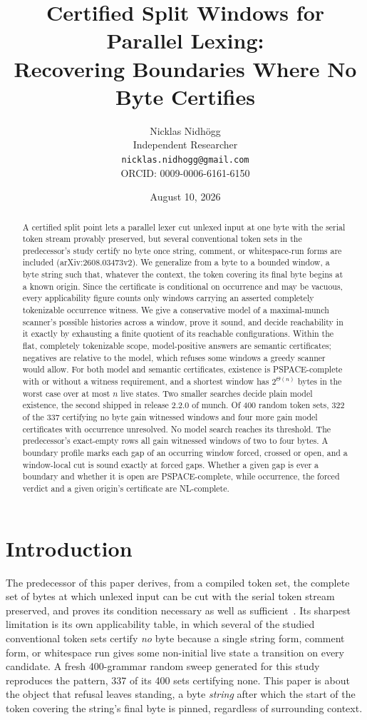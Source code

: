 \documentclass[11pt,a4paper]{article}
\title{Certified Split Windows for Parallel Lexing:\\Recovering Boundaries Where No Byte Certifies}
\author{Nicklas Nidh\"ogg\\[0.4em] \normalsize Independent Researcher\\ \normalsize
\texttt{nicklas.nidhogg@gmail.com}\\ \normalsize ORCID: 0009-0006-6161-6150}
\date{August 10, 2026}
\theoremstyle{definition}
\theoremstyle{plain}
\begin{document}
\maketitle

\begin{abstract}
A certified split point lets a parallel lexer cut unlexed input at one byte with the serial token stream provably
preserved, but several conventional token sets in the predecessor's study certify no byte once string, comment, or
whitespace-run forms are included (arXiv:2608.03473v2). We generalize from a byte to a bounded window, a byte string
such that, whatever the context, the token covering its final byte begins at a known origin. Since the certificate is
conditional on occurrence and may be vacuous, every applicability figure counts only windows carrying an asserted
completely tokenizable occurrence witness. We give a conservative model of a maximal-munch scanner's possible histories
across a window, prove it sound, and decide reachability in it exactly by exhausting a finite quotient of its reachable
configurations. Within the flat, completely tokenizable scope, model-positive answers are semantic certificates;
negatives are relative to the model, which refuses some windows a greedy scanner would allow. For both model and
semantic certificates, existence is PSPACE-complete with or without a witness requirement, and a shortest window has
$2^{\Theta(n)}$ bytes in the worst case over at most $n$ live states. Two smaller searches decide plain model existence,
the second shipped in release 2.2.0 of munch. Of 400 random token sets, 322 of the 337 certifying no byte gain witnessed
windows and four more gain model certificates with occurrence unresolved. No model search reaches its threshold. The
predecessor's exact-empty rows all gain witnessed windows of two to four bytes. A boundary profile marks each gap of an
occurring window forced, crossed or open, and a window-local cut is sound exactly at forced gaps. Whether a given gap is
ever a boundary and whether it is open are PSPACE-complete, while occurrence, the forced verdict and a given origin's
certificate are NL-complete.
\end{abstract}

\section{Introduction}
\label{sec:introduction}

The predecessor of this paper derives, from a compiled token set, the complete set of bytes at which unlexed input can
be cut with the serial token stream preserved, and proves its condition necessary as well as
sufficient~\cite{nidhogg2026splitpoints}. Its sharpest limitation is its own applicability table, in which several of
the studied conventional token sets certify \emph{no} byte because a single string form, comment form, or whitespace run
gives some non-initial live state a transition on every candidate. A fresh 400-grammar random sweep generated for this
study reproduces the pattern, 337 of its 400 sets certifying none. This paper is about the object that refusal leaves
standing, a byte \emph{string} after which the start of the token covering the string's final byte is pinned, regardless
of surrounding context.
\end{document}
